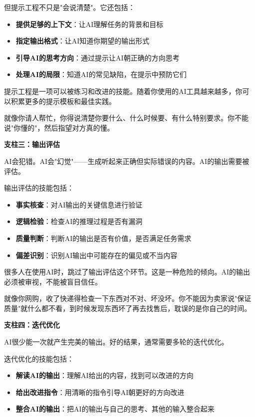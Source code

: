但提示工程不只是"会说清楚"。它还包括：

\begin{itemize}
\item \textbf{提供足够的上下文}：让AI理解任务的背景和目标
\item \textbf{指定输出格式}：让AI知道你期望的输出形式
\item \textbf{引导AI的思考方向}：通过提示让AI朝正确的方向思考
\item \textbf{处理AI的局限}：知道AI的常见缺陷，在提示中预防它们

\end{itemize}
提示工程是一项可以被练习和改进的技能。随着你使用的AI工具越来越多，你可以积累更多的提示模板和最佳实践。

就像你请人帮忙，你得说清楚你要什么、什么时候要、有什么特别要求。你不能说"你懂的"，然后指望对方真的懂。

\textbf{支柱三：输出评估}

AI会犯错。AI会"幻觉"——生成听起来正确但实际错误的内容。AI的输出需要被评估。

输出评估的技能包括：

\begin{itemize}
\item \textbf{事实核查}：对AI输出的关键信息进行验证
\item \textbf{逻辑检验}：检查AI的推理过程是否有漏洞
\item \textbf{质量判断}：判断AI的输出是否有价值，是否满足任务需求
\item \textbf{偏差识别}：识别AI输出中可能存在的偏见或不当内容

\end{itemize}
很多人在使用AI时，跳过了输出评估这个环节。这是一种危险的倾向。AI的输出必须被审视，不能被盲目信任。

就像你网购，收了快递得检查一下东西对不对、坏没坏。你不能因为卖家说"保证质量"就什么都不看，到时候发现东西坏了再去找售后，耽误的是你自己的时间。

\textbf{支柱四：迭代优化}

AI很少能一次就产生完美的输出。好的结果，通常需要多轮的迭代优化。

迭代优化的技能包括：

\begin{itemize}
\item \textbf{解读AI的输出}：理解AI给出的内容，找到可以改进的方向
\item \textbf{给出改进指令}：用清晰的指令引导AI朝更好的方向改进
\item \textbf{整合AI的输出}：把AI的输出与自己的思考、其他的输入整合起来

\end{itemize}
